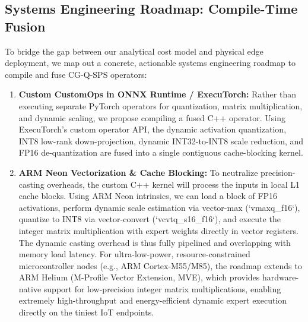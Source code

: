 \subsection{Systems Engineering Roadmap: Compile-Time Fusion}
\label{sec:compilation_roadmap}
To bridge the gap between our analytical cost model and physical edge deployment, we map out a concrete, actionable systems engineering roadmap to compile and fuse CG-Q-SPS operators:
\begin{enumerate}
  \item \textbf{Custom CustomOps in ONNX Runtime / ExecuTorch:} Rather than executing separate PyTorch operators for quantization, matrix multiplication, and dynamic scaling, we propose compiling a fused C++ operator. Using ExecuTorch's custom operator API, the dynamic activation quantization, INT8 low-rank down-projection, dynamic INT32-to-INT8 scale reduction, and FP16 de-quantization are fused into a single contiguous cache-blocking kernel.
  \item \textbf{ARM Neon Vectorization \& Cache Blocking:} To neutralize precision-casting overheads, the custom C++ kernel will process the inputs in local L1 cache blocks. Using ARM Neon intrinsics, we can load a block of FP16 activations, perform dynamic scale estimation via vector-max (`vmaxq\_f16`), quantize to INT8 via vector-convert (`vcvtq\_s16\_f16`), and execute the integer matrix multiplication with expert weights directly in vector registers. The dynamic casting overhead is thus fully pipelined and overlapping with memory load latency. For ultra-low-power, resource-constrained microcontroller nodes (e.g., ARM Cortex-M55/M85), the roadmap extends to ARM Helium (M-Profile Vector Extension, MVE), which provides hardware-native support for low-precision integer matrix multiplications, enabling extremely high-throughput and energy-efficient dynamic expert execution directly on the tiniest IoT endpoints.

\end{enumerate}
